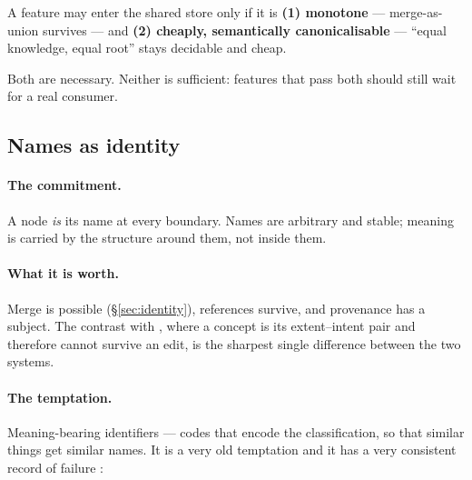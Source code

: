 \begin{keyidea}
A feature may enter the shared store only if it is
\textbf{(1) monotone} --- merge-as-union survives --- and
\textbf{(2) cheaply, semantically canonicalisable} --- ``equal knowledge,
equal root'' stays decidable and cheap.

Both are necessary. Neither is sufficient: features that pass both should
still wait for a real consumer.
\end{keyidea}

\subsection{Names as identity}
\label{sec:keep-names}

\paragraph{The commitment.} A node \emph{is} its name at every boundary. Names
are arbitrary and stable; meaning is carried by the structure around them, not
inside them.

\paragraph{What it is worth.} Merge is possible (\S\ref{sec:identity}),
references survive, and provenance has a subject. The contrast with \fca{},
where a concept is its extent--intent pair and therefore cannot survive an
edit, is the sharpest single difference between the two systems.

\paragraph{The temptation.} Meaning-bearing identifiers --- codes that encode
the classification, so that similar things get similar names. It is a very old
temptation and it has a very consistent record of failure
\citep{eco1995}:

